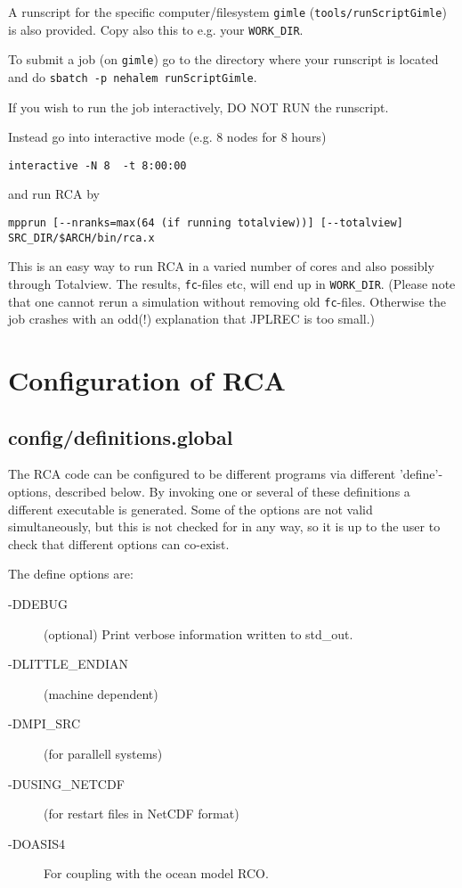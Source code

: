 \documentclass{article}
\begin{document}
A runscript for the specific computer/filesystem \verb+gimle+
(\verb+tools/runScriptGimle+) is also provided. Copy also this to e.g. your \verb+WORK_DIR+.  

To submit a job (on \verb+gimle+) go to the directory where your runscript is located and do \verb+sbatch -p nehalem runScriptGimle+.

If you wish to run the job interactively, DO NOT RUN the runscript.

Instead go into interactive mode (e.g. 8 nodes for 8 hours) 
\begin{verbatim}
interactive -N 8  -t 8:00:00
\end{verbatim}
and run RCA by 
\begin{verbatim}
mpprun [--nranks=max(64 (if running totalview))] [--totalview] SRC_DIR/$ARCH/bin/rca.x
\end{verbatim}
This is an easy way to run RCA in a varied number of cores and also possibly through Totalview.
The results, \verb+fc+-files etc, will end up in
\verb+WORK_DIR+. (Please note that one cannot rerun a simulation
without 
removing old \verb+fc+-files. Otherwise the job crashes with an odd(!)
explanation that JPLREC is too small.) 

\section{Configuration of RCA}
\label{sec:config}

\subsection{config/definitions.global}
\label{sec:configdef}

The RCA code can be configured to be different programs via
different 'define'-options, described below. By invoking one or
several of these definitions a different executable is generated. Some
of the options are not valid simultaneously, but this is not checked
for in any way, so it is up to the user to check that different
options can co-exist.

The define options are:
\begin{description} 
\item[-DDEBUG] (optional) Print verbose information written to std\_out.
\item[-DLITTLE\_ENDIAN] (machine dependent) 
\item[-DMPI\_SRC] (for parallell systems) 
\item[-DUSING\_NETCDF] (for restart files in NetCDF format) 
\item[-DOASIS4] For coupling with the ocean model RCO.
\end{description}
\end{document}
